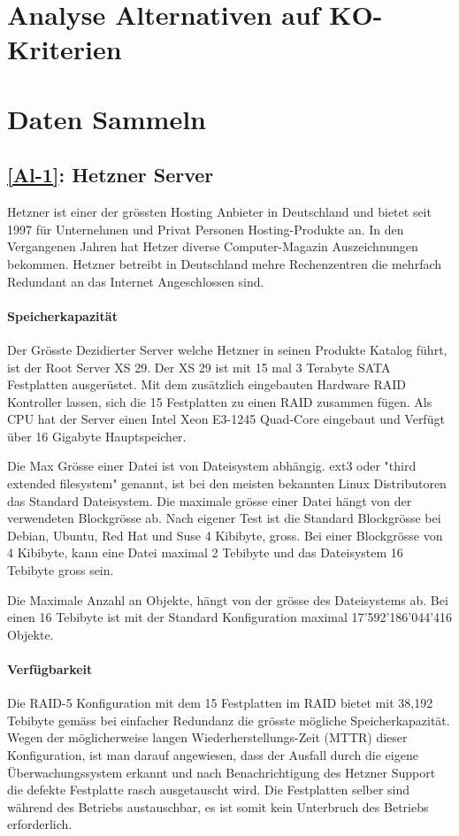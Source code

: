 \section{Analyse Alternativen auf KO-Kriterien}

\section{Daten Sammeln}
\subsection{\ref{Al-1}: Hetzner Server}
Hetzner ist einer der grössten Hosting Anbieter in Deutschland und bietet seit 1997 für Unternehmen und Privat Personen Hosting-Produkte an. In den Vergangenen Jahren hat Hetzer diverse Computer-Magazin Auszeichnungen bekommen. Hetzner betreibt in Deutschland mehre Rechenzentren die mehrfach Redundant an das Internet Angeschlossen sind.

\paragraph{Speicherkapazität}
Der Grösste Dezidierter Server welche Hetzner in seinen Produkte Katalog führt, ist der Root Server XS 29. Der XS 29 ist mit 15 mal 3 Terabyte SATA Festplatten ausgerüstet. Mit dem zusätzlich eingebauten Hardware RAID Kontroller lassen, sich die 15 Festplatten zu einen RAID zusammen fügen.
Als CPU hat der Server einen Intel Xeon E3-1245 Quad-Core eingebaut und Verfügt über 16 Gigabyte Hauptspeicher. 

Die Max Grösse einer Datei ist von Dateisystem abhängig. ext3 oder "third extended filesystem" genannt, ist bei den meisten bekannten Linux Distributoren das Standard Dateisystem. Die maximale grösse einer Datei hängt von der verwendeten Blockgrösse ab. Nach eigener Test ist die Standard Blockgrösse bei Debian, Ubuntu, Red Hat und Suse 4 Kibibyte, gross. Bei einer Blockgrösse von 4 Kibibyte, kann eine Datei maximal 2 Tebibyte und das Dateisystem 16 Tebibyte gross sein. \cite{Card1993}

Die Maximale Anzahl an Objekte, hängt von der grösse des Dateisystems ab. Bei einen 16 Tebibyte ist mit der Standard Konfiguration maximal 17'592'186'044'416 Objekte. 

\paragraph*{Verfügbarkeit}
Die RAID-5 Konfiguration mit dem 15 Festplatten im RAID bietet mit 38,192 Tebibyte gemäss  bei einfacher Redundanz die grösste mögliche Speicherkapazität. Wegen der möglicherweise langen Wiederherstellungs-Zeit (MTTR) dieser Konfiguration, ist man darauf angewiesen, dass der Ausfall durch die eigene Überwachungssystem erkannt und nach Benachrichtigung des Hetzner Support die defekte Festplatte rasch ausgetauscht wird. Die Festplatten selber sind während des Betriebs austauschbar, es ist somit kein Unterbruch des Betriebs erforderlich.

